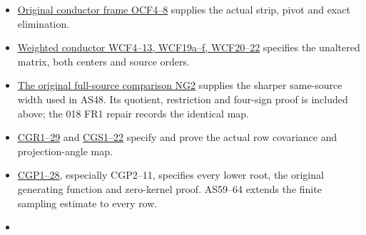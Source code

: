 \documentclass[11pt]{article}
\begin{document}
\begin{itemize}
\tightlist
\item
  \href{https://github.com/KokunoYumeto/zeta-function-research-reader/blob/5992ad50c0f2a06921f1fcaded7b4e38097c0739/workbenches/splitzero-tandem/continuations/20260920-original-kernel-mixed-determinants/providers/ORIGINAL_CONDUCTOR_STRIP_FRAME.tex\#L27}{Original conductor frame OCF4--8} supplies the actual strip, pivot and exact elimination.
\item
  \href{https://github.com/KokunoYumeto/zeta-function-research-reader/blob/5992ad50c0f2a06921f1fcaded7b4e38097c0739/workbenches/splitzero-tandem/continuations/20260920-original-kernel-mixed-determinants/providers/WEIGHTED_CONDUCTOR_FORWARD.tex\#L28}{Weighted conductor WCF4--13, WCF19a--f, WCF20--22} specifies the unaltered matrix, both centers and source orders.
\item
  \href{https://github.com/KokunoYumeto/zeta-function-research-reader/blob/5992ad50c0f2a06921f1fcaded7b4e38097c0739/workbenches/splitzero-tandem/continuations/20260920-original-kernel-mixed-determinants/providers/NATIVE_GAUSSIAN_TRANSFER.tex\#L51}{The original full-source comparison NG2} supplies the sharper same-source width used in AS48. Its quotient, restriction and four-sign proof is included above; the 018 FR1 repair records the identical map.
\item
  \href{https://github.com/KokunoYumeto/zeta-function-research-reader/blob/7230c00b9f07dd222b2aea95427d67918f3a8cac/workbenches/splitzero-tandem/continuations/20260921-local-covariance-activation/009/INVARIANT_COVARIANCE_POLE_FILTRATION.tex}{CGR1--29} and \href{https://github.com/KokunoYumeto/zeta-function-research-reader/blob/7230c00b9f07dd222b2aea95427d67918f3a8cac/workbenches/splitzero-tandem/continuations/20260921-local-covariance-activation/009/INVARIANT_STRIP_ANGLE_REDUCTION.tex}{CGS1--22} specify and prove the actual row covariance and projection-angle map.
\item
  \href{https://github.com/KokunoYumeto/zeta-function-research-reader/blob/7230c00b9f07dd222b2aea95427d67918f3a8cac/workbenches/splitzero-tandem/continuations/20260921-local-covariance-activation/010/ORIGINAL_PROJECTION_CAUCHY_ACTION.tex}{CGP1--28}, especially CGP2--11, specifies every lower root, the original generating function and zero-kernel proof. AS59--64 extends the finite sampling estimate to every row.
\item

\end{itemize}
\end{document}
